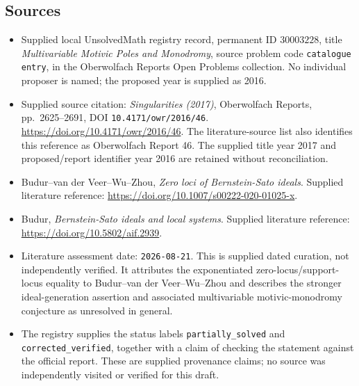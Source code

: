 \documentclass[11pt]{article}
\begin{document}
\subsection{Sources}
\begin{itemize}
\item Supplied local UnsolvedMath registry record, permanent ID \(30003228\), title \emph{Multivariable Motivic Poles and Monodromy}, source problem code \texttt{catalogue entry}, in the Oberwolfach Reports Open Problems collection. No individual proposer is named; the proposed year is supplied as 2016.
\item Supplied source citation: \emph{Singularities (2017)}, Oberwolfach Reports, pp.\ 2625--2691, DOI \texttt{10.4171/owr/2016/46}. \url{https://doi.org/10.4171/owr/2016/46}. The literature-source list also identifies this reference as Oberwolfach Report 46. The supplied title year 2017 and proposed/report identifier year 2016 are retained without reconciliation.
\item Budur--van der Veer--Wu--Zhou, \emph{Zero loci of Bernstein-Sato ideals}. Supplied literature reference: \url{https://doi.org/10.1007/s00222-020-01025-x}.
\item Budur, \emph{Bernstein-Sato ideals and local systems}. Supplied literature reference: \url{https://doi.org/10.5802/aif.2939}.
\item Literature assessment date: \texttt{2026-08-21}. This is supplied dated curation, not independently verified. It attributes the exponentiated zero-locus/support-locus equality to Budur--van der Veer--Wu--Zhou and describes the stronger ideal-generation assertion and associated multivariable motivic-monodromy conjecture as unresolved in general.
\item The registry supplies the status labels \texttt{partially\_solved} and \texttt{corrected\_verified}, together with a claim of checking the statement against the official report. These are supplied provenance claims; no source was independently visited or verified for this draft.
\end{itemize}
\end{document}
